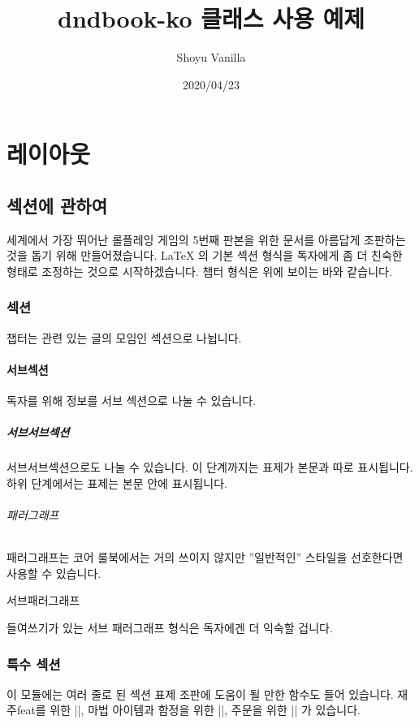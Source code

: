 \documentclass[letterpaper,twocolumn,openany,nodeprecatedcode]{dndbook-ko}
\title{dndbook-ko 클래스 사용 예제}
\author{Shoyu Vanilla}
\date{2020/04/23}
\begin{document}
\frontmatter

\maketitle

\tableofcontents

\mainmatter%

\part{레이아웃}

\chapter{섹션에 관하여}

 세계에서 가장 뛰어난 롤플레잉 게임의 5번째 판본을 위한 문서를 아름답게 조판하는 것을 돕기 위해 만들어졌습니다. \LaTeX{} 의 기본 섹션 형식을 독자에게 좀 더 친숙한 형태로 조정하는 것으로 시작하겠습니다. 챕터 형식은 위에 보이는 바와 같습니다.


\section{섹션}
챕터는 관련 있는 글의 모임인 섹션으로 나뉩니다.

\subsection{서브섹션 }
독자를 위해 정보를 서브 섹션으로 나눌 수 있습니다.

\subsubsection{서브서브섹션 }
서브서브섹션으로도 나눌 수 있습니다. 이 단계까지는 표제가 본문과 따로 표시됩니다. 하위 단계에서는 표제는 본문 안에 표시됩니다.

\paragraph{패러그래프}
패러그래프는 코어 룰북에서는 거의 쓰이지 않지만 ''일반적인'' 스타일을 선호한다면 사용할 수 있습니다.

\subparagraph{서브패러그래프}
들여쓰기가 있는 서브 패러그래프 형식은 독자에겐 더 익숙할 겁니다.

\section{특수 섹션}
이 모듈에는 여러 줄로 된 섹션 표제 조판에 도움이 될 만한 함수도 들어 있습니다. 재주feat를 위한 |\DndFeatHeader|, 마법 아이템과 함정을 위한 |\DndItemHeader|, 주문을 위한 |\DndSpellHeader| 가 있습니다.
\end{document}
